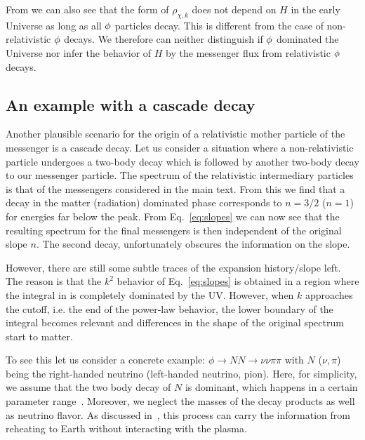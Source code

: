 \documentclass[superscriptaddress,aps,preprintnumbers,amsmath,showpacs,amssymb,prd,nofootinbib,reprint]{revtex4-1}
\begin{document}
{From  we can also see that the form of $\rho_{\chi,k}$ does not depend on $H$ in the early Universe as long as all $\phi$ particles decay. This is  different from the case of non-relativistic $\phi$ decays. 
We therefore can neither distinguish if $\phi$ dominated the Universe nor infer the behavior of $H$ by the messenger flux from relativistic $\phi$ decays. 


\subsection{An example with a cascade decay}\label{subsec:cascade}
Another plausible scenario for the origin of a relativistic mother particle of the messenger is a cascade decay.
Let us consider a situation where a non-relativistic particle undergoes a 
two-body decay which is followed by another two-body decay to our messenger particle.
The spectrum of the relativistic intermediary particles is that of the messengers considered in the main text. From this we find that a decay in the matter (radiation) dominated phase corresponds to $n=3/2$ ($n=1$) {for energies far below the peak}. From Eq.~\eqref{eq:slopes} we can now see that the resulting spectrum for the final messengers is then independent of the original slope $n$. 
The second decay, unfortunately obscures the information on the slope. 

However, there are still some subtle traces of the expansion history/slope left. The reason is that the $k^2$ behavior of Eq.~\eqref{eq:slopes} is obtained in a region where the integral in  is completely dominated by the UV. However, when $k$ approaches the cutoff, i.e. the end of the power-law behavior, the lower boundary of the integral becomes relevant and differences in the shape of the original spectrum start to matter.

To see this let us consider
a concrete example: 
$\phi \to N N \to \nu \nu \pi\pi$ with $N$ ($\nu, \pi$) being the right-handed neutrino (left-handed neutrino, pion). Here, for simplicity, we assume that the two body decay of $N$ is dominant, which happens in a certain parameter range~\cite{Gorbunov:2007ak}. Moreover, we neglect the masses of the decay products as well as neutrino flavor. 
As discussed in~\cite{Jaeckel:2020oet}, this process can carry the information from reheating to Earth without interacting with the plasma. 

}
\end{document}
